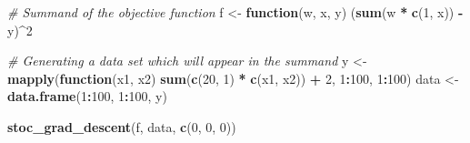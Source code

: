 \documentclass[12pt,]{article}
\newenvironment{Shaded}{\begin{snugshade}}{\end{snugshade}}
\newcommand{\CommentTok}[1]{\textcolor[rgb]{0.56,0.35,0.01}{\textit{#1}}}
\newcommand{\ControlFlowTok}[1]{\textcolor[rgb]{0.13,0.29,0.53}{\textbf{#1}}}
\newcommand{\DecValTok}[1]{\textcolor[rgb]{0.00,0.00,0.81}{#1}}
\newcommand{\KeywordTok}[1]{\textcolor[rgb]{0.13,0.29,0.53}{\textbf{#1}}}
\newcommand{\NormalTok}[1]{#1}
\newcommand{\OperatorTok}[1]{\textcolor[rgb]{0.81,0.36,0.00}{\textbf{#1}}}
\newcommand{\StringTok}[1]{\textcolor[rgb]{0.31,0.60,0.02}{#1}}
\begin{document}
\begin{Shaded}
\begin{Highlighting}[]
    \CommentTok{# Summand of the objective function}
\NormalTok{    f <-}\StringTok{ }\ControlFlowTok{function}\NormalTok{(w, x, y) (}\KeywordTok{sum}\NormalTok{(w }\OperatorTok{*}\StringTok{ }\KeywordTok{c}\NormalTok{(}\DecValTok{1}\NormalTok{, x)) }\OperatorTok{-}\StringTok{ }\NormalTok{y)}\OperatorTok{^}\DecValTok{2}

    \CommentTok{# Generating a data set which will appear in the summand}
\NormalTok{    y <-}\StringTok{ }\KeywordTok{mapply}\NormalTok{(}\ControlFlowTok{function}\NormalTok{(x1, x2) }\KeywordTok{sum}\NormalTok{(}\KeywordTok{c}\NormalTok{(}\DecValTok{20}\NormalTok{, }\DecValTok{1}\NormalTok{) }\OperatorTok{*}\StringTok{ }\KeywordTok{c}\NormalTok{(x1, x2)) }\OperatorTok{+}\StringTok{ }\DecValTok{2}\NormalTok{, }\DecValTok{1}\OperatorTok{:}\DecValTok{100}\NormalTok{, }\DecValTok{1}\OperatorTok{:}\DecValTok{100}\NormalTok{)}
\NormalTok{    data <-}\StringTok{ }\KeywordTok{data.frame}\NormalTok{(}\DecValTok{1}\OperatorTok{:}\DecValTok{100}\NormalTok{, }\DecValTok{1}\OperatorTok{:}\DecValTok{100}\NormalTok{, y)}

    \KeywordTok{stoc_grad_descent}\NormalTok{(f, data, }\KeywordTok{c}\NormalTok{(}\DecValTok{0}\NormalTok{, }\DecValTok{0}\NormalTok{, }\DecValTok{0}\NormalTok{))}
\end{Highlighting}
\end{Shaded}
\end{document}

